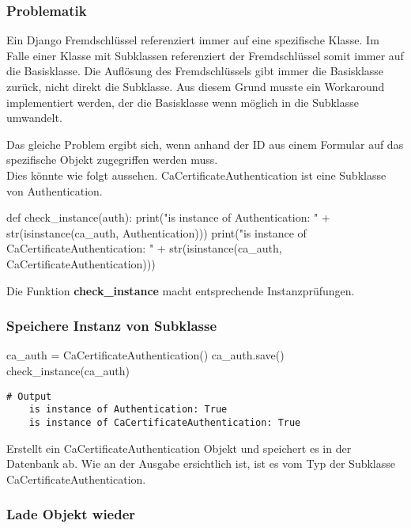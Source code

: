 \subsubsection{Problematik}
Ein Django Fremdschlüssel referenziert immer auf eine spezifische Klasse. Im Falle einer Klasse mit Subklassen referenziert der Fremdschlüssel somit immer auf die Basisklasse. Die Auflösung des Fremdschlüssels gibt immer die Basisklasse zurück, nicht direkt die Subklasse. Aus diesem Grund musste ein Workaround implementiert werden, der die Basisklasse wenn möglich in die Subklasse umwandelt.

Das gleiche Problem ergibt sich, wenn anhand der ID aus einem Formular auf das spezifische Objekt zugegriffen werden muss.
\\
Dies könnte wie folgt aussehen. CaCertificateAuthentication ist eine Subklasse von Authentication.
\newpage
\medskip
\begin{python}
    def check_instance(auth):
        print("is instance of Authentication: " + 
            str(isinstance(ca_auth, Authentication)))
        print("is instance of CaCertificateAuthentication: " + 
            str(isinstance(ca_auth, CaCertificateAuthentication)))
\end{python}
Die Funktion \textbf{check\_instance} macht entsprechende Instanzprüfungen.\\


\subsubsection{Speichere Instanz von Subklasse}

\begin{python}
    ca_auth = CaCertificateAuthentication()
    ca_auth.save()
    check_instance(ca_auth)
\end{python}

\begin{lstlisting}[style=BashInputStyle]
    # Output
    is instance of Authentication: True
    is instance of CaCertificateAuthentication: True
\end{lstlisting}    
Erstellt ein  CaCertificateAuthentication Objekt und speichert es in der Datenbank ab. Wie an der Ausgabe ersichtlich ist, ist es vom Typ der Subklasse CaCertificateAuthentication.\\

\medskip

\subsubsection{Lade Objekt wieder}

